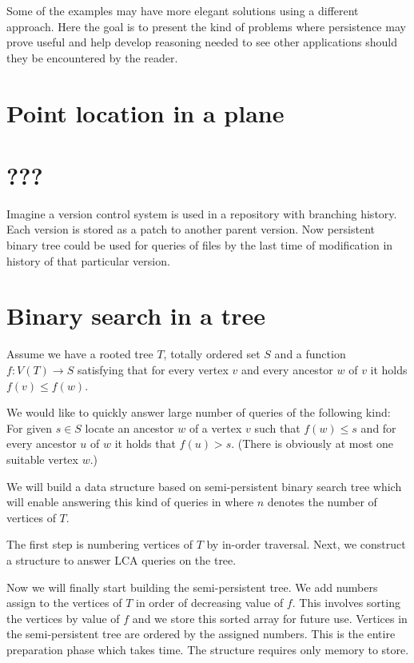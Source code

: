 Some of the examples may have more elegant solutions using a different approach. Here the goal is to present the kind of problems where persistence may prove useful and help develop reasoning needed to see other applications should they be encountered by the reader.

\section{Point location in a plane}

\section{???}

Imagine a version control system is used in a repository with branching history. Each version is stored as a patch to another parent version. Now persistent binary tree could be used for queries of files by the last time of modification in history of that particular version.

\section{Binary search in a tree}

Assume we have a rooted tree $T$, totally ordered set $S$ and a function $f: V(T) \rightarrow S$ satisfying that for every vertex $v$ and every ancestor $w$ of $v$ it holds $f(v) \leq f(w)$. 


We would like to quickly answer large number of queries of the following kind: For given $s \in S$ locate an ancestor $w$ of a vertex $v$ such that $f(w) \leq s$ and for every ancestor $u$ of $w$ it holds that $f(u) > s$. (There is obviously at most one suitable vertex $w$.)

We will build a data structure based on semi-persistent binary search tree which will enable answering this kind of queries in  where $n$ denotes the number of vertices of $T$.

The first step is numbering vertices of $T$ by in-order traversal. Next, we construct a structure to answer LCA queries on the tree. %

Now we will finally start building the semi-persistent tree. We add numbers assign to the vertices of $T$ in order of decreasing value of $f$. This involves sorting the vertices by value of $f$ and we store this sorted array for future use. Vertices in the semi-persistent tree are ordered by the assigned numbers. This is the entire preparation phase which takes  time. The structure requires only  memory to store.

